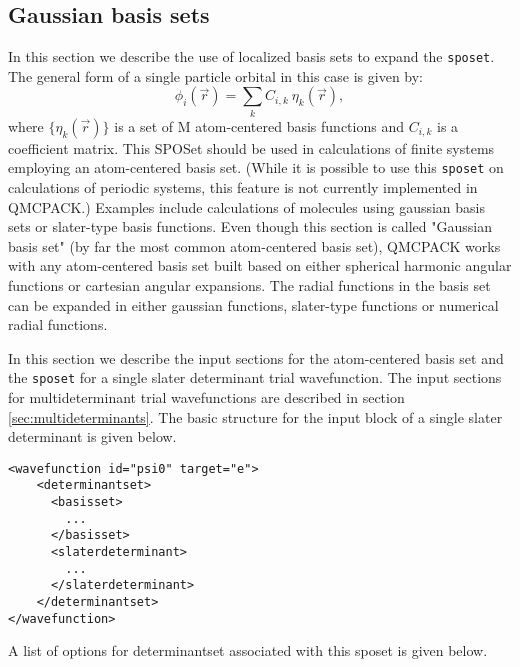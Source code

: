 \subsection{Gaussian basis sets}
\label{sec:gaussianbasis}

In this section we describe the use of localized basis sets to expand the \texttt{sposet}. The general form of a single particle orbital in this case is given by:
\begin{equation}
\phi_i(\vec{r}) = \sum_k C_{i,k} \ \eta_k(\vec{r}),
\end{equation}
where $\{\eta_k(\vec{r})\}$ is a set of M atom-centered basis functions and $C_{i,k}$ is a coefficient matrix. This SPOSet should be used in calculations of finite systems employing an atom-centered
basis set. (While it is possible to use this \texttt{sposet} on calculations of periodic systems, this feature is not currently implemented in QMCPACK.) Examples include calculations of molecules using gaussian basis sets or slater-type basis functions. Even though this section is called "Gaussian basis set" (by far the most common atom-centered basis set), QMCPACK works with any atom-centered basis set built based on either spherical harmonic angular functions or cartesian angular expansions. The radial functions in the basis set can be expanded in either gaussian functions, slater-type functions or numerical radial functions. 

In this section we describe the input sections for the atom-centered basis set and the \texttt{sposet} for a single slater determinant trial wavefunction. The input sections for multideterminant trial wavefunctions are described in section \ref{sec:multideterminants}. The basic structure for the input block of a single slater determinant is given below.

\begin{minipage}{\linewidth}
\begin{lstlisting}[caption=Basic input block for a single determinant trial wavefunction using a sposet expanded on an atom-centered basis set.]
<wavefunction id="psi0" target="e">
    <determinantset>
      <basisset>
        ...
      </basisset>
      <slaterdeterminant>
        ...
      </slaterdeterminant>
    </determinantset>    
</wavefunction>
\end{lstlisting}
\end{minipage}

A list of options for determinantset associated with this sposet is given below.

